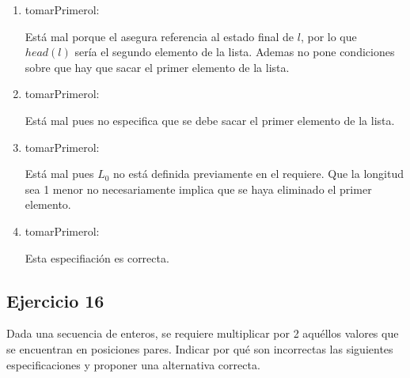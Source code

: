 \begin{enumerate}[label=\alph*)]
      \item \begin{proc}{tomarPrimero}{\Inout l: \TLista{\float}}{\float}
            \end{proc}

            Está mal porque el asegura referencia al estado final de $l$, por lo que $head(l)$ sería el segundo elemento de la lista. Ademas no pone condiciones sobre que hay que sacar el primer elemento de la lista.

      \item \begin{proc}{tomarPrimero}{\Inout l: \TLista{\float}}{\float}
            \end{proc}

            Está mal pues no especifica que se debe sacar el primer elemento de la lista.

      \item \begin{proc}{tomarPrimero}{\Inout l: \TLista{\float}}{\float}
            \end{proc}

            Está mal pues $L_0$ no está definida previamente en el requiere. Que la longitud sea 1 menor no necesariamente implica que se haya eliminado el primer elemento.

      \item \begin{proc}{tomarPrimero}{\Inout l: \TLista{\float}}{\float}
            \end{proc}

            Esta especifiación es correcta.
\end{enumerate}

\subsection{Ejercicio 16}
Dada una secuencia de enteros, se requiere multiplicar por 2 aquéllos valores que se encuentran en posiciones pares. Indicar por qué son incorrectas las siguientes especiﬁcaciones y proponer una alternativa correcta.

